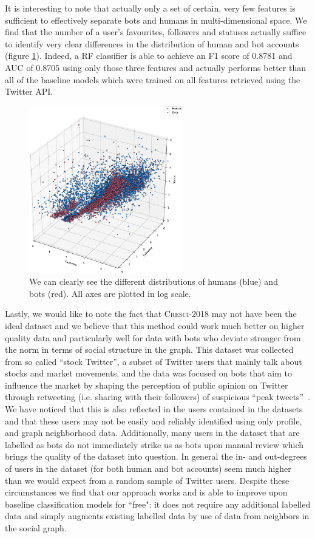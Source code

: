 It is interesting to note that actually only a set of certain, very few features is sufficient to effectively separate bots and humans in multi-dimensional space. We find that the number of a user's favourites, followers and statuses actually suffice to identify very clear differences in the distribution of human and bot accounts (figure \ref{fig:3dvis}). Indeed, a RF classifier is able to achieve an F1 score of 0.8781 and AUC of 0.8705 using only those three features and actually performs better than all of the baseline models which were trained on all features retrieved using the Twitter API.

\begin{figure}
    \centering
    \includegraphics[width=0.6\textwidth]{paper/FIG/3dvis_base-crop.pdf}
    \caption{We can clearly see the different distributions of humans (blue) and bots (red). All axes are plotted in log scale.}
    \label{fig:3dvis}
\end{figure}

Lastly, we would like to note the fact that \textsc{Cresci-2018} may not have been the ideal dataset and we believe that this method could work much better on higher quality data and particularly well for data with bots who deviate stronger from the norm in terms of social structure in the graph. This dataset was collected from so called ``stock Twitter'', a subset of Twitter users that mainly talk about stocks and market movements, and the data was focused on bots that aim to influence the market by shaping the perception of public opinion on Twitter through retweeting (i.e. sharing with their followers) of suspicious ``peak tweets''~\cite{cresci2018fake}. We have noticed that this is also reflected in the users contained in the datasets and that these users may not be easily and reliably identified using only profile, and graph neighborhood data. Additionally, many users in the dataset that are labelled as bots do not immediately strike us as bots upon manual review which brings the quality of the dataset into question. In general the in- and out-degrees of users in the dataset (for both human and bot accounts) seem much higher than we would expect from a random sample of Twitter users. Despite these circumstances we find that our approach works and is able to improve upon baseline classification models for ``free": it does not require any additional labelled data and simply augments existing labelled data by use of data from neighbors in the social graph. 